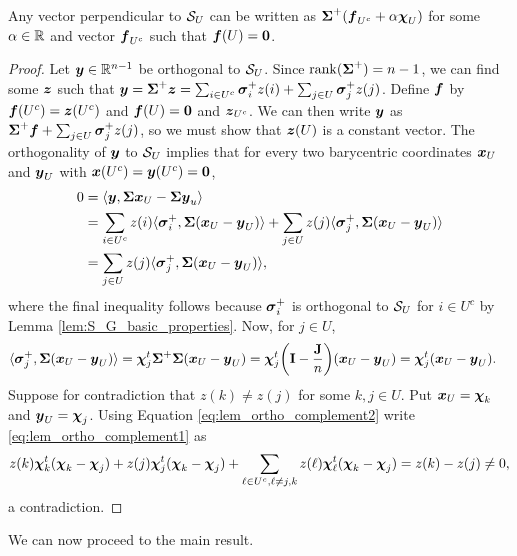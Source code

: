 \begin{lemma}
	\label{lem:S_U_ortho_complement}
	Any vector perpendicular to $\mathcal{S}_U$ can be written as $\boldsymbol{\Sigma}^+(\vb*{f}_{U^c}+\alpha \boldsymbol{\chi}_U)$ for some $\alpha\in\mathbb{R}$ and vector $\vb*{f}_{U^c}$ such that $\vb*{f}(U)=\vb{0}$. 
\end{lemma}
\begin{proof}
	Let $\vb*{y}\in\mathbb{R}^{n-1}$ be orthogonal to $\mathcal{S}_U$. Since $\rank(\boldsymbol{\Sigma}^+)=n-1$, we can find some $\vb*{z}$ such that $\vb*{y}=\boldsymbol{\Sigma}^+\vb*{z}=\sum_{i\in U^c}\vb*{\sigma}_i^+z(i) + \sum_{j\in U}\vb*{\sigma}_j^+z(j)$. Define $\vb*{f}$ by $\vb*{f}(U^c)=\vb*{z}(U^c)$ and $\vb*{f}(U)=\vb{0}$ and $\vb*{z}_{U^c}$.  We can then write $\vb*{y}$ as $\boldsymbol{\Sigma}^+\vb*{f}+\sum_{j\in U}\vb*{\sigma}_j^+z(j)$, so we must show that $\vb*{z}(U)$ is a constant vector. The orthogonality of $\vb*{y}$ to $\mathcal{S}_U$ implies that for every two barycentric coordinates $\vb*{x}_U$ and $\vb*{y}_U$ with $\vb*{x}(U^c)=\vb*{y}(U^c)=\vb{0}$, 
	\begin{align}
	0 &= \langle \vb*{y},\boldsymbol{\Sigma}\vb*{x}_U-\boldsymbol{\Sigma}\vb*{y}_u\rangle \notag \\
	&= \sum_{i\in U^c}z(i) \langle \vb*{\sigma}_i^+,\boldsymbol{\Sigma}(\vb*{x}_U-\vb*{y}_U)\rangle + \sum_{j\in U}z(j)\langle \vb*{\sigma}_j^+,\boldsymbol{\Sigma}(\vb*{x}_U-\vb*{y}_U)\rangle  \notag \\
	&= \sum_{j\in U}z(j)\langle \vb*{\sigma}_j^+,\boldsymbol{\Sigma}(\vb*{x}_U-\vb*{y}_U)\rangle, \label{eq:lem_ortho_complement1}
	\end{align} 
	where the final inequality follows because $\vb*{\sigma}_i^+$ is orthogonal to $\mathcal{S}_U$ for $i\in U^c$ by Lemma \ref{lem:S_G_basic_properties}.
	 Now, for $j\in U$, 
	\begin{align}
	\langle \vb*{\sigma}_j^+,\boldsymbol{\Sigma}(\vb*{x}_U-\vb*{y}_U)\rangle &= \boldsymbol{\chi}_j^t \boldsymbol{\Sigma}^+\boldsymbol{\Sigma}(\vb*{x}_U-\vb*{y}_U) = \boldsymbol{\chi}_j^t \bigg(\vb{I} - \frac{\vb{J}}{n}\bigg)(\vb*{x}_U-\vb*{y}_U) = \boldsymbol{\chi}_j^t (\vb*{x}_U-\vb*{y}_U). \label{eq:lem_ortho_complement2}
	\end{align}
	Suppose for contradiction that $z(k)\neq z(j)$ for some $k,j\in U$. Put $\vb*{x}_U = \boldsymbol{\chi}_k$ and $\vb*{y}_U=\boldsymbol{\chi}_j$. Using Equation  \eqref{eq:lem_ortho_complement2} write \eqref{eq:lem_ortho_complement1} as 
	\begin{align*}
	z(k)\boldsymbol{\chi}_k^t(\boldsymbol{\chi}_k-\boldsymbol{\chi}_j) + z(j)\boldsymbol{\chi}_j^t(\boldsymbol{\chi}_k -\boldsymbol{\chi}_j) + \sum_{\ell\in U^c,\ell\neq j,k}z(\ell)\boldsymbol{\chi}_\ell^t(\boldsymbol{\chi}_k-\boldsymbol{\chi}_j) = z(k)-z(j)\neq 0,
	\end{align*}
	a contradiction. 
\end{proof}

We can now proceed to the main result. 

